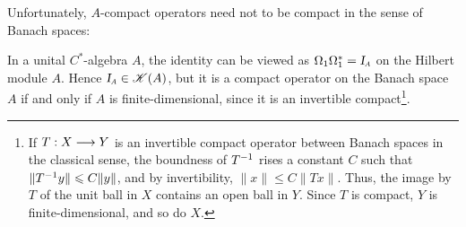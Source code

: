 Unfortunately, $A$-compact operators need not to be compact in the sense of Banach spaces:

\begin{contraexemplo}
In a unital $C^*$-algebra $A$, the identity can be viewed as $\Omega_1 \Omega_1^* = \sub \Id A$ on the Hilbert module $A$. Hence $\sub \Id A \in \mathscr K(A)$, but it is a compact operator on the Banach space $A$ if and only if $A$ is finite-dimensional, since it is an invertible compact\footnote{If $T:X\longrightarrow Y$ is an invertible compact operator between Banach spaces in the classical sense, the boundness of ${T}^{-1}$ rises a constant $C$ such that $\|{T}^{-1}y\| \leqslant C\|y\|$, and by invertibility, $\|x\|\leqslant C\|Tx\|$. Thus, the image by $T$ of the unit ball in $X$ contains an open ball in $Y$. Since $T$ is compact, $Y$ is
finite-dimensional, and so do $X$.}. 
\end{contraexemplo}


